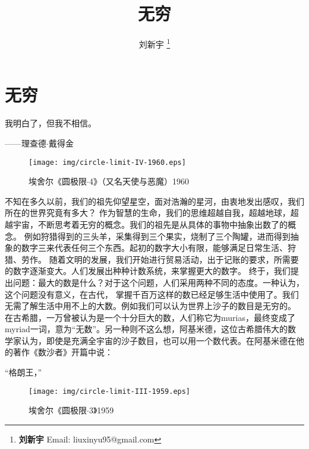 \documentclass{article}
\begin{document}
\title{无穷}

\author{刘新宇
\thanks{{\bfseries 刘新宇} \newline
  Email: liuxinyu95@gmail.com \newline}
  }

\maketitle
\fi


\ifx\wholebook\relax
\chapter{无穷}
\fi

\epigraph{我明白了，但我不相信。}{——理查德$\cdot$戴得金}


\begin{wrapfigure}{R}{0.4\textwidth}
 \centering
 \texttt{[image: img/circle-limit-IV-1960.eps]}
 \captionsetup{labelformat=empty}
 \caption{埃舍尔《圆极限$\cdot$4》（又名天使与恶魔）1960}
 \label{fig:Penrose-triangle}
\end{wrapfigure}

不知在多久以前，我们的祖先仰望星空，面对浩瀚的星河，由衷地发出感叹，我们所在的世界究竟有多大？
作为智慧的生命，我们的思维超越自我，超越地球，超越宇宙，不断思考着无穷的概念。我们的祖先是从具体的事物中抽象出数了的概念。
例如狩猎得到的三头羊，采集得到三个果实，烧制了三个陶罐，进而得到抽象的数字三来代表任何三个东西。起初的数字大小有限，能够满足日常生活、狩猎、劳作。
随着文明的发展，我们开始进行贸易活动，出于记账的要求，所需要的数字逐渐变大。人们发展出种种计数系统，来掌握更大的数字。
终于，我们提出问题：最大的数是什么？对于这个问题，人们采用两种不同的态度。一种认为，这个问题没有意义，在古代，
掌握千百万这样的数已经足够生活中使用了。我们无需了解生活中用不上的大数。例如我们可以认为世界上沙子的数目是无穷的。
在古希腊，一万曾被认为是一个十分巨大的数，人们称它为murias，最终变成了myriad一词，意为“无数”\cite{Del-linfini-2018}。另一种则不这么想，阿基米德，这位古希腊伟大的数学家认为，即使是充满全宇宙的沙子数目，也可以用一个数代表。在阿基米德在他的著作《数沙者》开篇中说：

“格朗王，”

\begin{wrapfigure}{L}{0.4\textwidth}
 \centering
 \texttt{[image: img/circle-limit-III-1959.eps]}
 \captionsetup{labelformat=empty}
 \caption{埃舍尔《圆极限$\cdot$3》1959}
 \label{fig:Penrose-triangle}
\end{wrapfigure}
\end{document}
